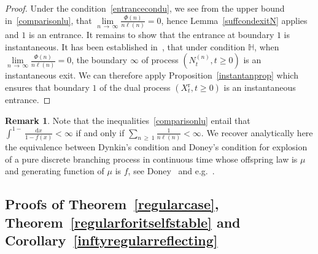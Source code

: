 \documentclass[10pt]{amsart}
\theoremstyle{definition}\newtheorem{defi}[theo]{Definition}\newtheorem{rema}[theo]{Remark}\newtheorem{exam}[theo]{Example}\newtheorem{exem}[theo]{Example}\newtheorem{nota}[theo]{Notation}
\newcommand{\ddr}{\mathrm{d}}
\newcommand{\rmr}{\mathrm{r}}
\newcommand{\bbH}{\mathbb{H}}
\begin{document}
\begin{proof}
Under the condition~\eqref{entrancecondu}, we see from the upper bound in~\eqref{comparisonlu}, that $\underset{n\,\rightarrow\,\infty}{\lim}\frac{\Phi(n)}{n\ell(n)}=0$, hence Lemma~\ref{suffcondexitN} applies and $1$ is an entrance. It remains to show that the entrance at boundary $1$ is instantaneous. It has been established in~\cite[Proposition~5.2]{explosion}, that under condition $\bbH$, when $\underset{n\,\rightarrow\,\infty}{\lim} \frac{\Phi(n)}{n\ell(n)}=0$, the boundary $\infty$ of process $(N_t^{(n)},t\geq 0)$ is an instantaneous exit. We can therefore apply Proposition~\ref{instantanprop} which ensures that boundary $1$ of the dual process $(X_t^{\rmr},t\geq 0)$ is an instantaneous entrance.
\end{proof}


\begin{rema}\label{tauberianremark}
Note that the inequalities~\eqref{comparisonlu} entail that
$\int^{1-}\frac{\ddr x}{1-f(x)}<\infty$ if and only if $\sum_{n\,\geq\,1}\frac{1}{n\ell(n)}<\infty$. We recover analytically here the equivalence between Dynkin's condition and Doney's condition for explosion of a pure discrete branching process in continuous time whose offspring law is $\mu$ and generating function of $\mu$ is $f$, see Doney~\cite{Doney1984} and e.g.~\cite[Section~2.4]{explosion}.
\end{rema}

\subsection{Proofs of Theorem~\ref{regularcase}, Theorem~\ref{regularforitselfstable} and Corollary~\ref{inftyregularreflecting}}
\end{document}
